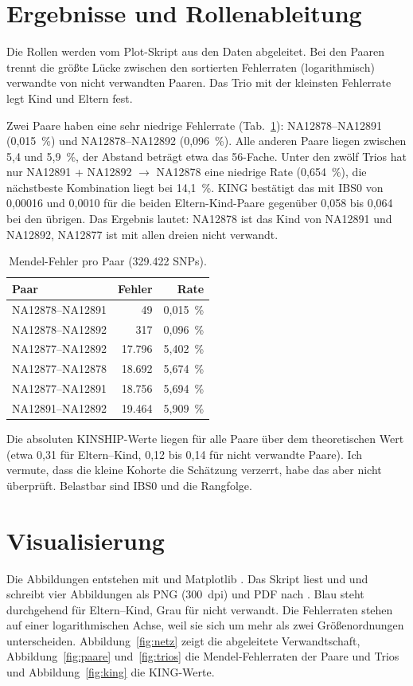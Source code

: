 \documentclass[10pt,a4paper,twocolumn]{article}
\begin{document}
\section{Ergebnisse und Rollenableitung}
\label{sec:erg}
Die Rollen werden vom Plot-Skript aus den Daten abgeleitet. Bei den Paaren trennt die größte Lücke zwischen den sortierten Fehlerraten (logarithmisch) verwandte von nicht verwandten Paaren. Das Trio mit der kleinsten Fehlerrate legt Kind und Eltern fest.

Zwei Paare haben eine sehr niedrige Fehlerrate (Tab.~\ref{tab:paare}): NA12878--NA12891 (0,015~\%) und NA12878--NA12892 (0,096~\%). Alle anderen Paare liegen zwischen 5,4 und 5,9~\%, der Abstand beträgt etwa das 56-Fache. Unter den zwölf Trios hat nur NA12891 + NA12892 $\rightarrow$ NA12878 eine niedrige Rate (0,654~\%), die nächstbeste Kombination liegt bei 14,1~\%. KING bestätigt das mit IBS0 von 0,00016 und 0,0010 für die beiden Eltern-Kind-Paare gegenüber 0,058 bis 0,064 bei den übrigen. Das Ergebnis lautet: NA12878 ist das Kind von NA12891 und NA12892, NA12877 ist mit allen dreien nicht verwandt.

\begin{table}[t]
\centering
\small
\caption{Mendel-Fehler pro Paar (329.422 SNPs).}
\label{tab:paare}
\begin{tabular}{@{}lrr@{}}
\toprule
Paar & Fehler & Rate\\
\midrule
NA12878--NA12891 & 49 & 0,015~\%\\
NA12878--NA12892 & 317 & 0,096~\%\\
\addlinespace
NA12877--NA12892 & 17.796 & 5,402~\%\\
NA12877--NA12878 & 18.692 & 5,674~\%\\
NA12877--NA12891 & 18.756 & 5,694~\%\\
NA12891--NA12892 & 19.464 & 5,909~\%\\
\bottomrule
\end{tabular}
\end{table}

Die absoluten KINSHIP-Werte liegen für alle Paare über dem theoretischen Wert (etwa 0,31 für Eltern--Kind, 0,12 bis 0,14 für nicht verwandte Paare). Ich vermute, dass die kleine Kohorte die Schätzung verzerrt, habe das aber nicht überprüft. Belastbar sind IBS0 und die Rangfolge.

\section{Visualisierung}
Die Abbildungen entstehen mit  und Matplotlib \citep{hunter2007}. Das Skript liest  und  und schreibt vier Abbildungen als PNG (300~dpi) und PDF nach . Blau steht durchgehend für Eltern--Kind, Grau für nicht verwandt. Die Fehlerraten stehen auf einer logarithmischen Achse, weil sie sich um mehr als zwei Größenordnungen unterscheiden. Abbildung~\ref{fig:netz} zeigt die abgeleitete Verwandtschaft, Abbildung~\ref{fig:paare} und~\ref{fig:trios} die Mendel-Fehlerraten der Paare und Trios und Abbildung~\ref{fig:king} die KING-Werte.
\end{document}
